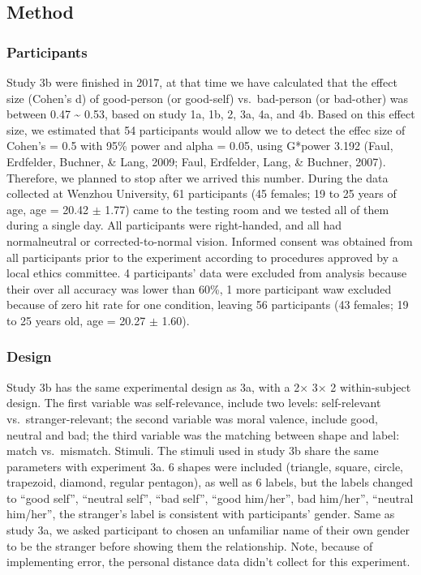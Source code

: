 \documentclass[man]{apa6}
\begin{document}
\hypertarget{method-4}{%
\subsection{Method}\label{method-4}}

\hypertarget{participants-5}{%
\subsubsection{Participants}\label{participants-5}}

Study 3b were finished in 2017, at that time we have calculated that the effect size (Cohen's d) of good-person (or good-self) vs.~bad-person (or bad-other) was between 0.47 \textasciitilde{} 0.53, based on study 1a, 1b, 2, 3a, 4a, and 4b. Based on this effect size, we estimated that 54 participants would allow we to detect the effec size of Cohen's = 0.5 with 95\% power and alpha = 0.05, using G*power 3.192 (Faul, Erdfelder, Buchner, \& Lang, 2009; Faul, Erdfelder, Lang, \& Buchner, 2007). Therefore, we planned to stop after we arrived this number. During the data collected at Wenzhou University, 61 participants (45 females; 19 to 25 years of age, age = 20.42 \(\pm\) 1.77) came to the testing room and we tested all of them during a single day. All participants were right-handed, and all had normalneutral or corrected-to-normal vision. Informed consent was obtained from all participants prior to the experiment according to procedures approved by a local ethics committee. 4 participants' data were excluded from analysis because their over all accuracy was lower than 60\%, 1 more participant waw excluded because of zero hit rate for one condition, leaving 56 participants (43 females; 19 to 25 years old, age = 20.27 \(\pm\) 1.60).

\hypertarget{design-1}{%
\subsubsection{Design}\label{design-1}}

Study 3b has the same experimental design as 3a, with a 2× 3× 2 within-subject design. The first variable was self-relevance, include two levels: self-relevant vs.~stranger-relevant; the second variable was moral valence, include good, neutral and bad; the third variable was the matching between shape and label: match vs.~mismatch.
Stimuli. The stimuli used in study 3b share the same parameters with experiment 3a. 6 shapes were included (triangle, square, circle, trapezoid, diamond, regular pentagon), as well as 6 labels, but the labels changed to \enquote{good self}, \enquote{neutral self}, \enquote{bad self}, \enquote{good him/her}, bad him/her'', \enquote{neutral him/her}, the stranger's label is consistent with participants' gender. Same as study 3a, we asked participant to chosen an unfamiliar name of their own gender to be the stranger before showing them the relationship. Note, because of implementing error, the personal distance data didn't collect for this experiment.
\end{document}
